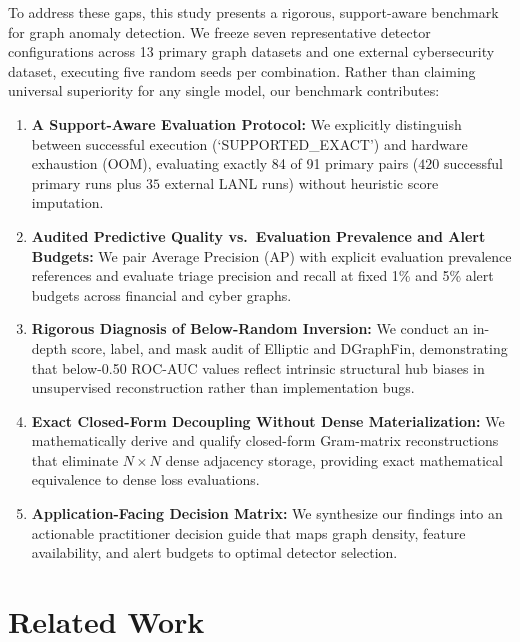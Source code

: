 \documentclass[applsci,article,submit,moreauthors,pdftex]{Definitions/mdpi}
\begin{document}
To address these gaps, this study presents a rigorous, support-aware benchmark for graph anomaly detection. We freeze seven representative detector configurations across 13 primary graph datasets and one external cybersecurity dataset, executing five random seeds per combination. Rather than claiming universal superiority for any single model, our benchmark contributes:
\begin{enumerate}
    \item \textbf{A Support-Aware Evaluation Protocol:} We explicitly distinguish between successful execution (`SUPPORTED\_EXACT') and hardware exhaustion (OOM), evaluating exactly 84 of 91 primary pairs ($420$ successful primary runs plus $35$ external LANL runs) without heuristic score imputation.
    \item \textbf{Audited Predictive Quality vs.\ Evaluation Prevalence and Alert Budgets:} We pair Average Precision (AP) with explicit evaluation prevalence references and evaluate triage precision and recall at fixed 1\% and 5\% alert budgets across financial and cyber graphs.
    \item \textbf{Rigorous Diagnosis of Below-Random Inversion:} We conduct an in-depth score, label, and mask audit of Elliptic and DGraphFin, demonstrating that below-0.50 ROC-AUC values reflect intrinsic structural hub biases in unsupervised reconstruction rather than implementation bugs.
    \item \textbf{Exact Closed-Form Decoupling Without Dense Materialization:} We mathematically derive and qualify closed-form Gram-matrix reconstructions that eliminate $N \times N$ dense adjacency storage, providing exact mathematical equivalence to dense loss evaluations.
    \item \textbf{Application-Facing Decision Matrix:} We synthesize our findings into an actionable practitioner decision guide that maps graph density, feature availability, and alert budgets to optimal detector selection.
\end{enumerate}

\section{Related Work}
\label{sec:related}
\end{document}
